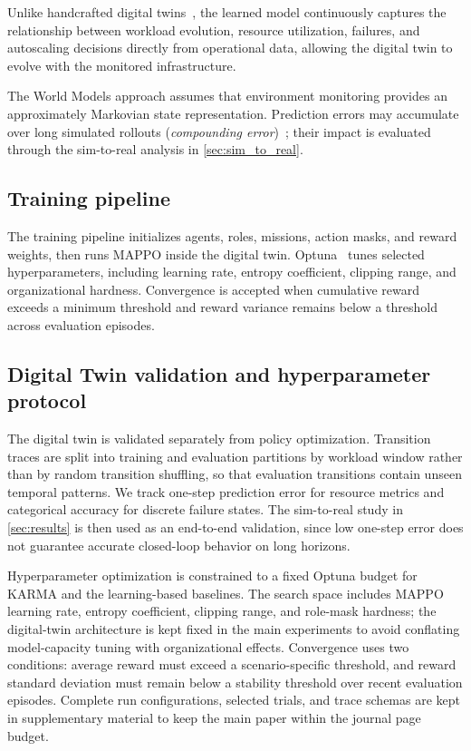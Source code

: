 \documentclass[journal]{IEEEtran}
\begin{document}
Unlike handcrafted digital twins~\cite{fuller2020digital}, the learned model continuously captures the relationship between workload evolution, resource utilization, failures, and autoscaling decisions directly from operational data, allowing the digital twin to evolve with the monitored infrastructure.

The World Models approach assumes that environment monitoring provides an approximately Markovian state representation. Prediction errors may accumulate over long simulated rollouts (\emph{compounding error})~\cite{planet2019,dreamer2020}; their impact is evaluated through the sim-to-real analysis in \autoref{sec:sim_to_real}.

\subsection{Training pipeline}

The training pipeline initializes agents, roles, missions, action masks, and reward weights, then runs MAPPO inside the digital twin. Optuna~\cite{akiba2019optuna} tunes selected hyperparameters, including learning rate, entropy coefficient, clipping range, and organizational hardness. Convergence is accepted when cumulative reward exceeds a minimum threshold and reward variance remains below a threshold across evaluation episodes.

\subsection{Digital Twin validation and hyperparameter protocol}

The digital twin is validated separately from policy optimization. Transition traces are split into training and evaluation partitions by workload window rather than by random transition shuffling, so that evaluation transitions contain unseen temporal patterns. We track one-step prediction error for resource metrics and categorical accuracy for discrete failure states. The sim-to-real study in \autoref{sec:results} is then used as an end-to-end validation, since low one-step error does not guarantee accurate closed-loop behavior on long horizons.

Hyperparameter optimization is constrained to a fixed Optuna budget for KARMA and the learning-based baselines. The search space includes MAPPO learning rate, entropy coefficient, clipping range, and role-mask hardness; the digital-twin architecture is kept fixed in the main experiments to avoid conflating model-capacity tuning with organizational effects. Convergence uses two conditions: average reward must exceed a scenario-specific threshold, and reward standard deviation must remain below a stability threshold over recent evaluation episodes. Complete run configurations, selected trials, and trace schemas are kept in supplementary material to keep the main paper within the journal page budget.
\end{document}
